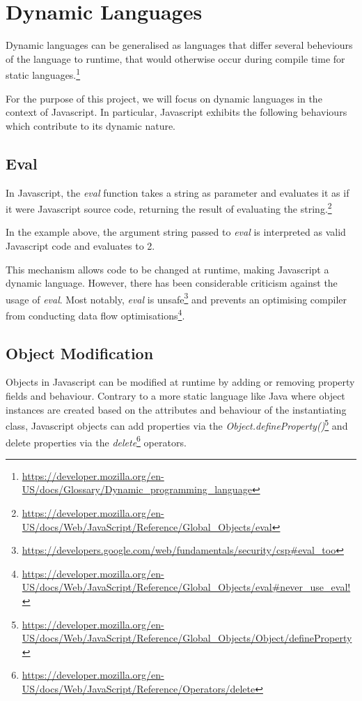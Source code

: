 \section{Dynamic Languages}

Dynamic languages can be generalised as languages that differ several beheviours of the language to runtime, that would otherwise occur during compile time for static languages.\footnote{\url{https://developer.mozilla.org/en-US/docs/Glossary/Dynamic_programming_language}}

For the purpose of this project, we will focus on dynamic languages in the context of Javascript. In particular, Javascript exhibits the following behaviours which contribute to its dynamic nature.

\subsection{Eval}

In Javascript, the \textit{eval} function takes a string as parameter and evaluates it as if it were Javascript source code, returning the result of evaluating the string.\footnote{\url{https://developer.mozilla.org/en-US/docs/Web/JavaScript/Reference/Global_Objects/eval}}




In the example above, the argument string passed to \textit{eval} is interpreted as valid Javascript code and evaluates to 2.

This mechanism allows code to be changed at runtime, making Javascript a dynamic language. However, there has been considerable criticism against the usage of \textit{eval}. Most notably, \textit{eval} is unsafe\footnote{\url{https://developers.google.com/web/fundamentals/security/csp#eval_too}} and prevents an optimising compiler from conducting data flow optimisations\footnote{\url{https://developer.mozilla.org/en-US/docs/Web/JavaScript/Reference/Global_Objects/eval#never_use_eval!}}.

\subsection{Object Modification}

Objects in Javascript can be modified at runtime by adding or removing property fields and behaviour. Contrary to a more static language like Java where object instances are created based on the attributes and behaviour of the instantiating class, Javascript objects can add properties via the \textit{Object.defineProperty()}\footnote{\url{https://developer.mozilla.org/en-US/docs/Web/JavaScript/Reference/Global_Objects/Object/defineProperty}} and delete properties via the \textit{delete}\footnote{\url{https://developer.mozilla.org/en-US/docs/Web/JavaScript/Reference/Operators/delete}} operators.

